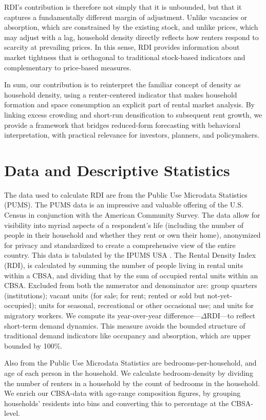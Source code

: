 \documentclass[pdflatex,sn-basic]{sn-jnl}%
\theoremstyle{thmstyleone}%
\theoremstyle{thmstyletwo}%
\theoremstyle{thmstylethree}%
\begin{document}
RDI’s contribution is therefore not simply that it is unbounded, but that it captures a
fundamentally different margin of adjustment. Unlike vacancies or absorption, which
are constrained by the existing stock, and unlike prices, which may adjust with a lag,
household density directly reflects how renters respond to scarcity at prevailing prices.
In this sense, RDI provides information about market tightness that is orthogonal to
traditional stock-based indicators and complementary to price-based measures.

In sum, our contribution is to reinterpret the familiar concept of density as household
density, using a renter-centered indicator that makes household formation and space
consumption an explicit part of rental market analysis. By linking excess crowding and
short-run densification to subsequent rent growth, we provide a framework that bridges
reduced-form forecasting with behavioral interpretation, with practical relevance for
investors, planners, and policymakers.



\section{Data and Descriptive Statistics}\label{section3}
The data used to calculate RDI are from the Public Use Microdata Statistics (PUMS). The PUMS data is an impressive and valuable offering of the U.S. Census in conjunction with the American Community Survey. The data allow for visibility into myriad aspects of a respondent's life (including the number of people in their household and whether they rent or own their home), anonymized for privacy and standardized to create a comprehensive view of the entire country. This data is tabulated by the IPUMS USA \cite{ruggles2025ipums}. The Rental Density Index (RDI), is calculated by summing the number of people living in rental units within a CBSA, and dividing that by the sum of occupied rental units within an CBSA. Excluded from both the numerator and denominator are: group quarters (institutions); vacant units (for sale; for rent; rented or sold but not-yet-occupied); units for seasonal, recreational or other occasional use; and units for migratory workers. We compute its year-over-year difference---\(\Delta\text{RDI}\)---to reflect short-term demand dynamics. This measure avoids the bounded structure of traditional demand indicators like occupancy and absorption, which are upper bounded by 100\%. 

Also from the Public Use Microdata Statistics are bedrooms-per-household, and age of each person in the household. We calculate bedroom-density by dividing the number of renters in a household by the count of bedrooms in the household. We enrich our CBSA-data with age-range composition figures, by grouping households' residents into bins and converting this to percentage at the CBSA-level.
\end{document}
